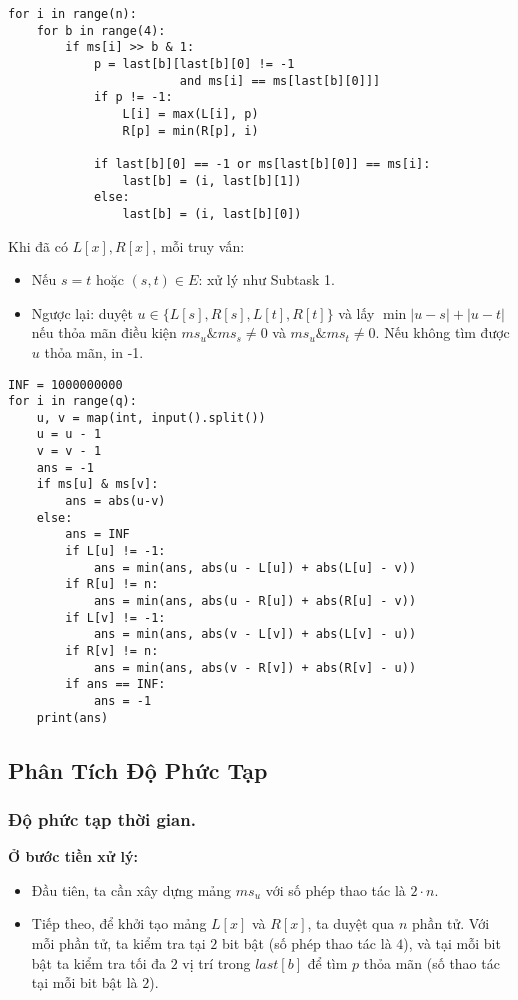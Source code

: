 \documentclass[12pt,a4paper]{article}
\begin{document}
\begin{lstlisting}
for i in range(n):
	for b in range(4):
		if ms[i] >> b & 1:
			p = last[b][last[b][0] != -1 
						and ms[i] == ms[last[b][0]]]
			if p != -1:
				L[i] = max(L[i], p)
				R[p] = min(R[p], i)
			
			if last[b][0] == -1 or ms[last[b][0]] == ms[i]:
				last[b] = (i, last[b][1])
			else: 
				last[b] = (i, last[b][0])
\end{lstlisting}
	Khi đã có $L[x], R[x]$, mỗi truy vấn:
	\begin{itemize}[nosep]
		\item Nếu $s = t$ hoặc $(s, t) \in E$: xử lý như Subtask 1.
		\item Ngược lại: duyệt $u \in \{L[s], R[s], L[t], R[t]\}$ và lấy $\min |u - s| + |u - t|$ nếu thỏa mãn điều kiện $ms_u \& ms_s \not = 0$ và $ms_u \& ms_t \not = 0$. Nếu không tìm được $u$ thỏa mãn, in -1.
	\end{itemize}
		\begin{lstlisting}
INF = 1000000000
for i in range(q):
	u, v = map(int, input().split())
	u = u - 1
	v = v - 1
	ans = -1
	if ms[u] & ms[v]:
		ans = abs(u-v)
	else:
		ans = INF
		if L[u] != -1:
			ans = min(ans, abs(u - L[u]) + abs(L[u] - v))
		if R[u] != n:
			ans = min(ans, abs(u - R[u]) + abs(R[u] - v))
		if L[v] != -1:
			ans = min(ans, abs(v - L[v]) + abs(L[v] - u))
		if R[v] != n:
			ans = min(ans, abs(v - R[v]) + abs(R[v] - u))
		if ans == INF:
			ans = -1
	print(ans)
	\end{lstlisting}
	
	\subsection{Phân Tích Độ Phức Tạp}
	
	\subsubsection{Độ phức tạp thời gian.}
	
	\textbf{Ở bước tiền xử lý:}
	
	\begin{itemize}
		\item Đầu tiên, ta cần xây dựng mảng $ms_u$ với số phép thao tác là $2 \cdot n$.
		\item Tiếp theo, để khởi tạo mảng $L[x]$ và $R[x]$, ta duyệt qua $n$ phần tử. 
		Với mỗi phần tử, ta kiểm tra tại $2$ bit bật (số phép thao tác là $4$), 
		và tại mỗi bit bật ta kiểm tra tối đa $2$ vị trí trong $last[b]$ để tìm $p$ thỏa mãn 
		(số thao tác tại mỗi bit bật là $2$).
	\end{itemize}
	
\end{document}
